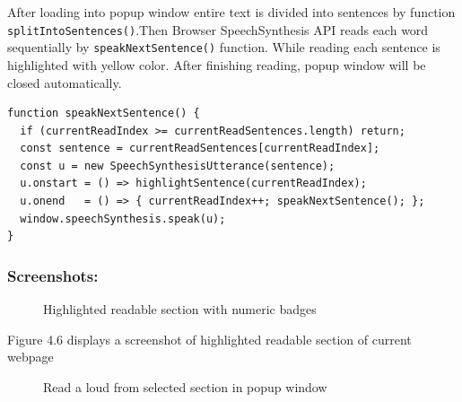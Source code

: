  After loading into popup window entire text is divided into sentences by function \texttt{splitIntoSentences()}.Then Browser SpeechSynthesis API reads each word sequentially by \texttt{speakNextSentence()} function. While reading each sentence is highlighted with yellow color. After finishing reading, popup window will be closed automatically.

 
\begin{verbatim}
function speakNextSentence() {
  if (currentReadIndex >= currentReadSentences.length) return;
  const sentence = currentReadSentences[currentReadIndex];
  const u = new SpeechSynthesisUtterance(sentence);
  u.onstart = () => highlightSentence(currentReadIndex);
  u.onend   = () => { currentReadIndex++; speakNextSentence(); };
  window.speechSynthesis.speak(u);
}
\end{verbatim}

\subsubsection*{Screenshots:}

\begin{figure}[H] 
    \centering
    \caption{Highlighted readable section with numeric badges}
    \label{fig:highlighted_readable_section}
\end{figure}

Figure 4.6 displays a screenshot of highlighted readable section of current webpage

\begin{figure}[H] 
    \centering
    \caption{Read a loud from selected section in popup window}
    \label{fig:read_loud_selected_section}
\end{figure}


